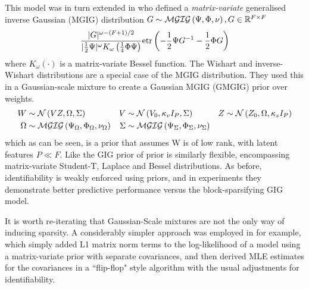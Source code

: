 This model was in turn extended in \cite{Yang2011} who defined a \emph{matrix-variate} generalised inverse Gaussian (MGIG) distribution $G\sim \mathcal{MGIG}\left(\Psi, \Phi, \nu\right), G \in { \mathbb{R}^{F \times F} }$
\begin{align}
\frac{|G|^{\omega - (F + 1)/2}}{|\frac{1}{2} \Psi|^\omega K_\omega \left(\frac{1}{4}\Phi \Psi\right)} \text{etr}\left( -\frac{1}{2} \Psi {G}^{-1} - \frac{1}{2} \Phi G \right)
\end{align}
where $K_\omega(\cdot)$ is a matrix-variate Bessel function. The Wishart and inverse-Wishart distributions are a special case of the MGIG distribution. They used this in a Gaussian-scale mixture to create a Gaussian MGIG (GMGIG) prior over weights.
\begin{align}
W & \sim \mathcal{N} \left(VZ, \Omega, \Sigma\right) &
V & \sim \mathcal{N} \left(V_0, \kappa_v I_P, \Sigma\right) &
Z & \sim \mathcal{N} \left(Z_0, \Omega, \kappa_z I_P\right) \\
\Omega & \sim \mathcal{MGIG}\left( \Psi_\Omega, \Phi_\Omega, \nu_\Omega \right) &
\Sigma & \sim \mathcal{MGIG}\left( \Psi_\Sigma, \Phi_\Sigma, \nu_\Sigma \right) &
\end{align}
which as can be seen, is a prior that assumes W is of low rank, with latent features $P \ll F$. Like the GIG prior of \cite{Archambeau2011} prior is similarly flexible, encompassing matrix-variate Student-T, Laplace and Bessel distributions. As before, identifiability is weakly enforced using priors, and in experiments they demonstrate better predictive performance versus the block-sparsifying GIG model.

It is worth re-iterating that Gaussian-Scale mixtures are not the only way of inducing sparsity. A considerably simpler approach was employed in \cite{Zhang2010a} for example, which simply added L1 matrix norm terms to the log-likelihood of a model using a matrix-variate prior with separate covariances, and then derived MLE estimates for the covariances in a ``flip-flop" style algorithm with the usual adjustments for identifiability. 





